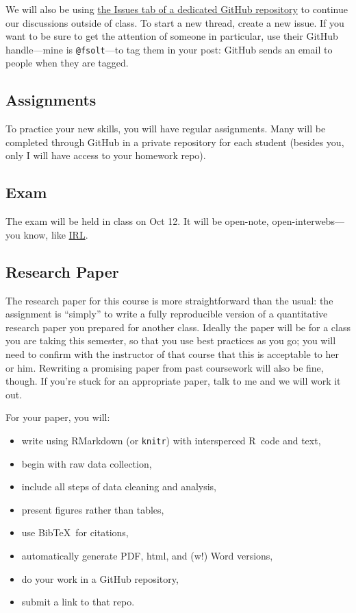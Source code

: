 \documentclass[11pt]{article}\usepackage[]{graphicx}\usepackage[]{color}
\newcommand{\R}{\textsf{R}~}
\begin{document}
We will also be using \href{https://github.com/cmcr-class/Discussion/issues}{the Issues tab of a dedicated GitHub repository} to continue our discussions outside of class. 
To start a new thread, create a new issue. 
If you want to be sure to get the attention of someone in particular, use their GitHub handle---mine is \texttt{@fsolt}---to tag them in your post: GitHub sends an email to people when they are tagged.


\subsection{Assignments}
To practice your new skills, you will have regular assignments.  Many will be completed through GitHub in a private repository for each student (besides you, only I will have access to your homework repo).  


\subsection{Exam}
The exam will be held in class on Oct 12.  It will be open-note, open-interwebs---you know, like \href{http://www.theallium.com/engineering/computer-programming-to-be-officially-renamed-googling-stackoverflow/}{IRL}.


\subsection{Research Paper}
The research paper for this course is more straightforward than the usual: the assignment is ``simply'' to write a fully reproducible version of a quantitative research paper you prepared for another class.  
Ideally the paper will be for a class you are taking this semester, so that you use best practices as you go; you will need to confirm with the instructor of that course that this is acceptable to her or him.  
Rewriting a promising paper from past coursework will also be fine, though.  If you're stuck for an appropriate paper, talk to me and we will work it out.

\noindent For your paper, you will:

\begin{itemize}
\item write using RMarkdown (or \texttt{knitr}) with intersperced \R code and text,
\item begin with raw data collection,
\item include all steps of data cleaning and analysis,
\item present figures rather than tables,
\item use Bib\TeX~for citations,
\item automatically generate PDF, html, and (\raisebox{0.7ex}{ee}\raisebox{0.3ex}{e}w\raisebox{-0.3ex}{ww}\raisebox{-0.7ex}{w}!) Word versions,
\item do your work in a GitHub repository,
\item submit a link to that repo.
\end{itemize}
\end{document}

